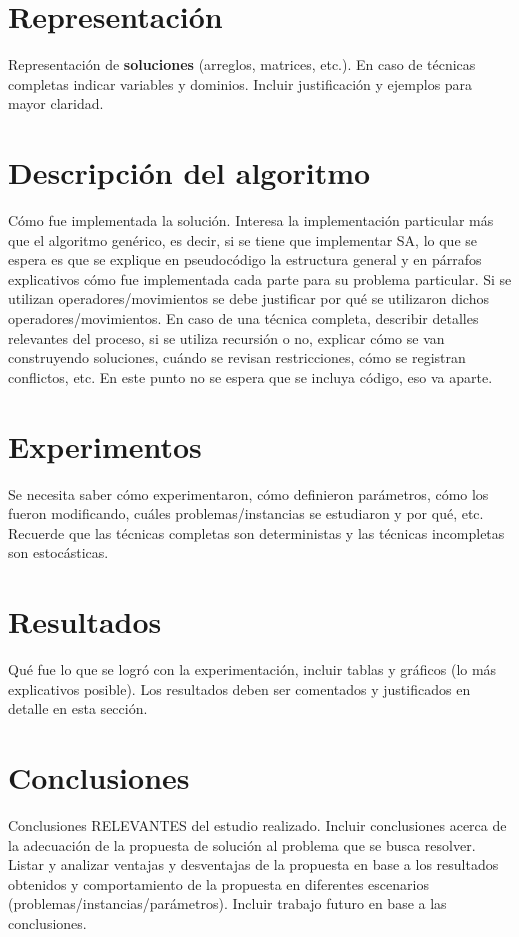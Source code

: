 \documentclass[letter, 10pt]{article}
\begin{document}
\section{Representaci\'on}
Representaci\'on de \textbf{soluciones} (arreglos, matrices, etc.). En caso de t\'ecnicas completas indicar variables y dominios. Incluir justificaci\'on y ejemplos para mayor claridad.

\section{Descripci\'on del algoritmo}
C\'omo fue implementada la soluci\'on. Interesa la implementaci\'on particular m\'as que el algoritmo gen\'erico, es decir, si se tiene que implementar SA, lo que se espera es que se explique en pseudoc\'odigo la estructura
general y en p\'arrafos explicativos c\'omo fue implementada cada parte para su problema particular. Si
se utilizan operadores/movimientos se debe justificar por qu\'e se utilizaron dichos operadores/movimientos. 
En caso de una t\'ecnica completa, describir detalles relevantes del proceso, si se utiliza recursi\'on o no, explicar c\'omo se van construyendo soluciones, cu\'ando se revisan restricciones, c\'omo se registran conflictos, etc. En este punto no se espera que se incluya c\'odigo, eso va aparte.

\section{Experimentos}
Se necesita saber c\'omo experimentaron, c\'omo definieron par\'ametros, 
c\'omo los fueron modificando, cu\'ales problemas/instancias se estudiaron y por qu\'e, etc. 
Recuerde que las t\'ecnicas completas son deterministas y las t\'ecnicas incompletas son estoc\'asticas.

\section{Resultados}
Qu\'e fue lo que se logr\'o con la experimentaci\'on, incluir tablas y gr\'aficos (lo m\'as explicativos posible).
Los resultados deben ser comentados y justificados en detalle en esta secci\'on.

\section{Conclusiones}
Conclusiones RELEVANTES del estudio realizado. Incluir conclusiones acerca de la adecuaci\'on de la propuesta de soluci\'on al problema que se busca resolver. Listar y analizar ventajas y desventajas de la propuesta en base a los resultados obtenidos y comportamiento de la propuesta en diferentes escenarios (problemas/instancias/par\'ametros). Incluir trabajo futuro en base a las conclusiones.
\end{document}
